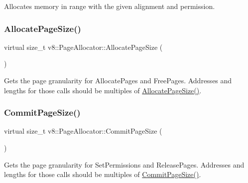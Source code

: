 Allocates memory in range with the given alignment and permission. \mbox{\label{classv8_1_1PageAllocator_a92c2f6dbb3afa6c47dafd4c12ab4641f}} 
\subsubsection{\texorpdfstring{Allocate\+Page\+Size()}{AllocatePageSize()}}
{\footnotesize\ttfamily virtual size\+\_\+t v8\+::\+Page\+Allocator\+::\+Allocate\+Page\+Size (\begin{DoxyParamCaption}{ }\end{DoxyParamCaption})\hspace{0.3cm}{\ttfamily [pure virtual]}}

Gets the page granularity for Allocate\+Pages and Free\+Pages. Addresses and lengths for those calls should be multiples of \mbox{\hyperlink{classv8_1_1PageAllocator_a92c2f6dbb3afa6c47dafd4c12ab4641f}{Allocate\+Page\+Size()}}. \mbox{\label{classv8_1_1PageAllocator_ad817d87004151e3824997415f2dc57e9}} 
\subsubsection{\texorpdfstring{Commit\+Page\+Size()}{CommitPageSize()}}
{\footnotesize\ttfamily virtual size\+\_\+t v8\+::\+Page\+Allocator\+::\+Commit\+Page\+Size (\begin{DoxyParamCaption}{ }\end{DoxyParamCaption})\hspace{0.3cm}{\ttfamily [pure virtual]}}

Gets the page granularity for Set\+Permissions and Release\+Pages. Addresses and lengths for those calls should be multiples of \mbox{\hyperlink{classv8_1_1PageAllocator_ad817d87004151e3824997415f2dc57e9}{Commit\+Page\+Size()}}. \mbox{\label{classv8_1_1PageAllocator_abc2e3fdc768aba7d35ce0cf44f14586c}} 
